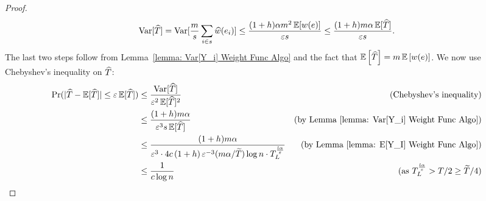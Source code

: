 \begin{proof}
        $$\operatorname*{\mathrm{Var}}[\widehat{T}] = \operatorname*{\mathrm{Var}}[\frac{m}{s} \sum_{i \in s} \widehat{w}(e_i)] \leq \frac{(1+h)\alpha m^2\operatorname*{\mathbb{E}}[w(e)]}{\varepsilon s} \leq \frac{(1+h)m\alpha\operatorname*{\mathbb{E}}[\widehat{T}]}{\varepsilon s}.$$
        The last two steps follow from Lemma~\ref{lemma: Var[Y_i] Weight Func Algo} and the fact that $\operatorname*{\mathbb{E}}\left[{\widehat{T}}\right] = m\operatorname*{\mathbb{E}}\left[{w(e)}\right]$.
        We now use Chebyshev's inequality on $\widehat{T}$:
        \begin{align*}
            \Pr(|\widehat{T} - \operatorname*{\mathbb{E}}[\widehat{T}]| \leq \varepsilon \operatorname*{\mathbb{E}}[\widehat{T}]) 
                    &\leq \frac{\operatorname*{\mathrm{Var}}[\widehat{T}]}{\varepsilon^2\operatorname*{\mathbb{E}}[\widehat{T}]^2}   &\text{(Chebyshev's inequality)}\\
                    &\leq \frac{(1+h)m\alpha}{\varepsilon^3s\operatorname*{\mathbb{E}}[\widehat{T}]}&\text{(by Lemma \ref{lemma: Var[Y_i] Weight Func Algo})}\\
                    &\leq \frac{(1+h)m\alpha}{\varepsilon^3\cdot 4c\left({1+h}\right)\varepsilon^{-3}(m\alpha/\widetilde{T})\log n \cdot T^{\frac{l\alpha}{\varepsilon}}_{L}} &\text{(by Lemma \ref{lemma: E[Y_I] Weight Func Algo})}\\
                    & \leq \frac{1}{c\log n} &\text{(as $T^{\frac{l\alpha}{\varepsilon}}_{L} > T/2 \geq \widetilde{T}/4$)}
        \end{align*}
    \end{proof}









